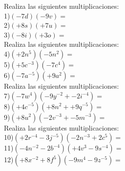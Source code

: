 \documentclass[a4paper,12pt]{article}
\begin{document}
 \pagebreak 
Realiza las siguientes multiplicaciones: \vspace{1cm}\\ 
1)$(-7d)(-9v)=$\vspace{1cm}\\ 
2)$(+8s)(+7u)=$\vspace{1cm}\\ 
3)$(-8i)(+3o)=$\vspace{1cm}\\ 
Realiza las siguientes multiplicaciones: \vspace{1cm}\\ 
4)$(+2n^{5})(-5n^{2} )=$\vspace{1cm}\\ 
5)$(+5c^{-3})(-7c^{4} )=$\vspace{1cm}\\ 
6)$(-7a^{-5})(+9a^{2} )=$\vspace{1cm}\\ 
Realiza las siguientes multiplicaciones: \vspace{1cm}\\ 
7)$(-7w^{4})(-9y^{-2}+-2i^{-4} )=$\vspace{1cm}\\ 
8)$(+4c^{-5})(+8n^{2}++9q^{-5} )=$\vspace{1cm}\\ 
9)$(+8u^{2})(-2v^{-3}+-5m^{-3} )=$\vspace{1cm}\\ 
Realiza las siguientes multiplicaciones: \vspace{1cm}\\ 
10)$(+2r^{-4}-3j^{-5} )(-2n^{-3}+2c^{5} )=$\vspace{1cm}\\ 
11)$(-4n^{-2}-2b^{-4} )(+4v^{3}-9s^{-4} )=$\vspace{1cm}\\ 
12)$(+8x^{-2}+8f^{5} )(-9m^{4}-9z^{-5} )=$\vspace{1cm}\\ 

 \pagebreak 
\end{document}
